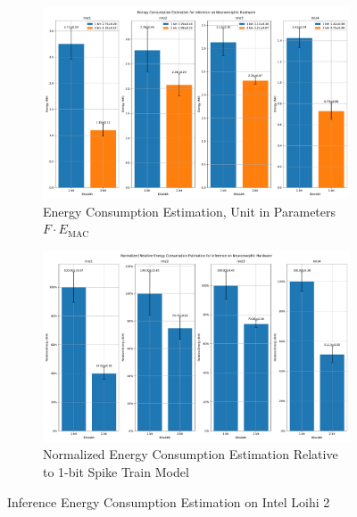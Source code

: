         \begin{figure}[H]
            \centering
            \begin{subfigure}[H]{0.48\textwidth}
                \includegraphics[width=\textwidth]{../timesteps/FashionMNIST/plots/fashionmnist_test_energy_nh.pdf}
                \caption{Energy Consumption Estimation, Unit in Parameters $F\cdot E_{\text{MAC}}$}
            \end{subfigure}
            \hfill
            \begin{subfigure}[H]{0.48\textwidth}
                \includegraphics[width=\textwidth]{../timesteps/FashionMNIST/plots/fashionmnist_test_relative_energy_nh.pdf}
                \caption{Normalized Energy Consumption Estimation Relative to 1-bit Spike Train Model}
            \end{subfigure}
            \caption{Inference Energy Consumption Estimation on Intel Loihi 2}
        \end{figure}

